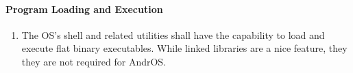   \paragraph{Program Loading and Execution}
  \begin{enumerate}
    \item The OS's shell and related utilities shall have the capability to load and execute flat binary executables. While linked libraries are a nice feature, they they are not required for AndrOS.
  \end{enumerate}







